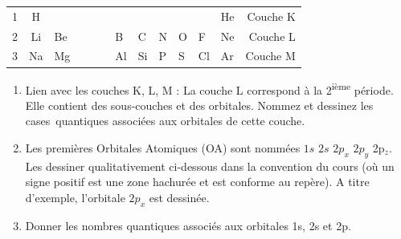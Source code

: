 \begin{center}
\begin{tabular}{rcllllllllllr}
1 & H  &    & & & &    &    &    &    &    & He & Couche K \\
2 & Li & Be & & & & B  & C  & N  & O  & F  & Ne & Couche L \\
3 & Na & Mg & & & & Al & Si & P  & S  & Cl & Ar & Couche M \\
\end{tabular}
\end{center}

\begin{enumerate}[\bf 1)]
\item Lien avec les couches K, L, M : La couche L correspond \`a la 2\textsuperscript{i\`eme} p\'eriode. Elle contient des
sous-couches et des orbitales. Nommez et dessinez les cases~quantiques associ\'ees aux orbitales de cette couche.
\item Les premi\`eres Orbitales Atomiques (OA) sont nomm\'ees $1s$ $2s$ $2p_x$ $2p_y$
2p$_z$. Les dessiner qualitativement ci-dessous dans la convention du cours (o\`u un signe positif est une
zone hachur\'ee et est conforme au rep\`ere). A titre d'exemple, l'orbitale $2p_x$ est dessin\'ee.
\item Donner les nombres quantiques associés aux orbitales 1s, 2s et 2p.
\end{enumerate}
%
